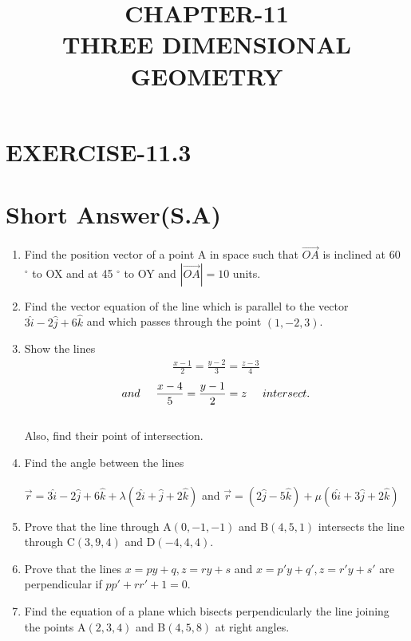 \documentclass[12pt]{article}
\begin{document}
\title{\textbf{CHAPTER-11 \\THREE DIMENSIONAL GEOMETRY}}
\maketitle
\begin{center}
\end{center}
\section*{EXERCISE-11.3}
\section*{Short Answer(S.A)}
\begin{enumerate}

\item  Find the position vector of a point A in space such that $\overrightarrow{OA}$ is inclined at 60 $^{\circ}$ to OX and at 45 $^{\circ}$ to OY and $|\overrightarrow{OA}| =10$ units.
\item  Find the vector equation of the line which is parallel to the vector $3\hat{i}-2\hat{j}+6\hat{k}$ and which passes through the point $(1,-2,3)$.
\item Show the lines
\begin{align*}
\frac{x-1}{2}=\frac{y-2}{3}=\frac{z-3}{4}
\end{align*}
\begin{align*}
and  \hspace{0.5cm} \frac{x-4}{5}=\frac{y-1}{2}=z \hspace{0.5cm} intersect.
\end{align*}
\\ Also, find their point of intersection.
\item Find the angle between the lines \\\\ $\overrightarrow{r}=3\hat{i}-2\hat{j}+6\hat{k}+\lambda(2\hat{i}+\hat{j}+2\hat{k})$ and $\overrightarrow{r}=(2\hat{j}-5\hat{k})+\mu(6\hat{i}+3\hat{j}+2\hat{k})$
\item Prove that the line through A$(0,-1,-1)$ and B$(4,5,1)$ intersects the line through C$(3,9,4)$ and D$(-4,4,4)$.
\item Prove that the lines $x=py+q , z=ry+s$ and $x=p'y+q', z=r'y+s'$ are perpendicular if $pp'+rr'+1=0$.
\item Find the equation of a plane which  bisects perpendicularly the line joining the points A$(2,3,4)$ and B$(4,5,8)$ at right angles.

\end{enumerate}
\end{document}
